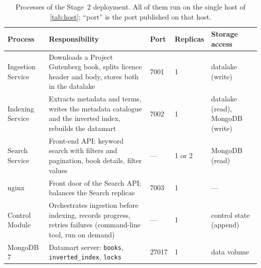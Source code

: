 \documentclass[10pt,a4paper]{article}
\newcommand{\code}[1]{\texttt{#1}}
\begin{document}
\begin{table}[htbp]
  \centering
  \small
  \caption{Processes of the Stage~2 deployment. All of them run on the single
  host of \cref{tab:host}; ``port'' is the port published on that host.}
  \label{tab:processes}
  \begin{tabularx}{\textwidth}{@{}l>{\raggedright\arraybackslash}Xlll@{}}
    \toprule
    Process & Responsibility & Port & Replicas & Storage access \\
    \midrule
    Ingestion Service & Downloads a Project Gutenberg book, splits licence
      header and body, stores both in the datalake & 7001 & 1 & datalake (write) \\
    Indexing Service & Extracts metadata and terms, writes the metadata
      catalogue and the inverted index, rebuilds the datamart & 7002 & 1 &
      datalake (read), MongoDB (write) \\
    Search Service & Front-end API: keyword search with filters and
      pagination, book details, filter values & --- & 1 or 2 & MongoDB (read) \\
    nginx & Front door of the Search API; balances the Search replicas & 7003
      & 1 & --- \\
    Control Module & Orchestrates ingestion before indexing, records progress,
      retries failures (command-line tool, run on demand) & --- & 1 &
      control state (append) \\
    MongoDB 7 & Datamart server: \code{books}, \code{inverted\_index},
      \code{locks} & 27017 & 1 & data volume \\
    \bottomrule
  \end{tabularx}
\end{table}
\end{document}
